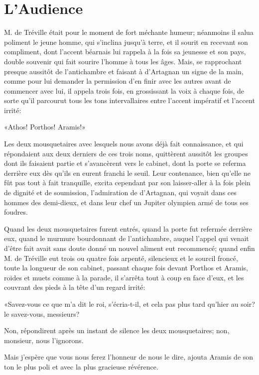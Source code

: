 
\chapter{L'Audience}

\lettrine{M}{.} de Tréville était pour le moment de fort méchante humeur; néanmoins il salua poliment le jeune homme, qui s'inclina jusqu'à terre, et il sourit en recevant son compliment, dont l'accent béarnais lui rappela à la fois sa jeunesse et son pays, double souvenir qui fait sourire l'homme à tous les âges. Mais, se rapprochant presque aussitôt de l'antichambre et faisant à d'Artagnan un signe de la main, comme pour lui demander la permission d'en finir avec les autres avant de commencer avec lui, il appela trois fois, en grossissant la voix à chaque fois, de sorte qu'il parcourut tous les tons intervallaires entre l'accent impératif et l'accent irrité: 

«Athos! Porthos! Aramis!» 

Les deux mousquetaires avec lesquels nous avons déjà fait connaissance, et qui répondaient aux deux derniers de ces trois noms, quittèrent aussitôt les groupes dont ils faisaient partie et s'avancèrent vers le cabinet, dont la porte se referma derrière eux dès qu'ils en eurent franchi le seuil. Leur contenance, bien qu'elle ne fût pas tout à fait tranquille, excita cependant par son laisser-aller à la fois plein de dignité et de soumission, l'admiration de d'Artagnan, qui voyait dans ces hommes des demi-dieux, et dans leur chef un Jupiter olympien armé de tous ses foudres. 

Quand les deux mousquetaires furent entrés, quand la porte fut refermée derrière eux, quand le murmure bourdonnant de l'antichambre, auquel l'appel qui venait d'être fait avait sans doute donné un nouvel aliment eut recommencé; quand enfin M. de Tréville eut trois ou quatre fois arpenté, silencieux et le sourcil froncé, toute la longueur de son cabinet, passant chaque fois devant Porthos et Aramis, roides et muets comme à la parade, il s'arrêta tout à coup en face d'eux, et les couvrant des pieds à la tête d'un regard irrité: 

«Savez-vous ce que m'a dit le roi, s'écria-t-il, et cela pas plus tard qu'hier au soir? le savez-vous, messieurs? 

\speak  Non, répondirent après un instant de silence les deux mousquetaires; non, monsieur, nous l'ignorons. 

\speak  Mais j'espère que vous nous ferez l'honneur de nous le dire, ajouta Aramis de son ton le plus poli et avec la plus gracieuse révérence. 

